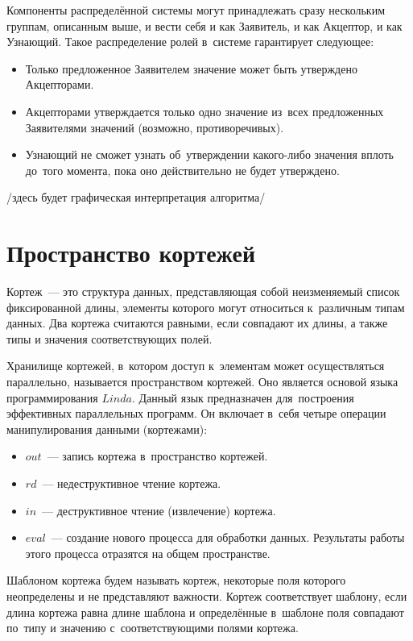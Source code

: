 Компоненты распределённой системы могут принадлежать сразу нескольким группам, описанным выше, и вести себя и как Заявитель, и как Акцептор, и как Узнающий. Такое распределение ролей в~системе гарантирует следующее:
\begin{itemize}
	\item Только предложенное Заявителем значение может быть утверждено Акцепторами.
	\item Акцепторами утверждается только одно значение из~всех предложенных Заявителями значений (возможно, противоречивых).
	\item Узнающий не сможет узнать об~утверждении какого-либо значения вплоть до~того момента, пока оно действительно не будет утверждено.
\end{itemize}

/здесь будет графическая интерпретация алгоритма/


\section{Пространство кортежей}\label{sec:4}
Кортеж~--- это структура данных, представляющая собой неизменяемый список фиксированной длины, элементы которого могут относиться к~различным типам данных. Два кортежа считаются равными, если совпадают их длины, а также типы и значения соответствующих полей.

Хранилище кортежей, в~котором доступ к~элементам может осуществляться параллельно, называется пространством кортежей. Оно является основой языка программирования $Linda$. Данный язык предназначен для~построения эффективных параллельных программ. Он включает в~себя четыре операции манипулирования данными (кортежами):
\begin{itemize}
	\item $out$~--- запись кортежа в~пространство кортежей.
	\item $rd$~--- недеструктивное чтение кортежа.
	\item $in$~--- деструктивное чтение (извлечение) кортежа.
	\item $eval$~--- создание нового процесса для обработки данных. Результаты работы этого процесса отразятся на общем пространстве.
\end{itemize}

Шаблоном кортежа будем называть кортеж, некоторые поля которого неопределены и не представляют важности. Кортеж соответствует шаблону, если длина кортежа равна длине шаблона и определённые в~шаблоне поля совпадают по~типу и значению с~соответствующими полями кортежа.

